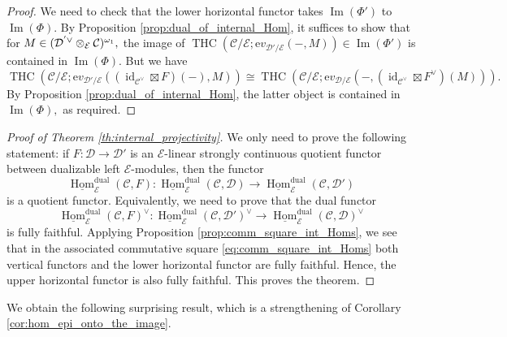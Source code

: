 \documentclass[11pt,leqno]{amsart}
\numberwithin{equation}{section}
\def\Hom{\operatorname{Hom}}
\newcommand{\tens}[1]{%
  \mathbin{\mathop{\otimes}\displaylimits_{#1}}%
}
\newcommand{\dual}{\operatorname{dual}}
\newcommand{\ev}{\mathrm ev}
\newcommand{\cD}{{\mathcal D}}
\newcommand{\cC}{{\mathcal C}}
\newcommand{\cE}{{\mathcal E}}
\newcommand{\un}{\underline}
\newcommand{\THC}{\operatorname{THC}}
\newcommand{\Fun}{\operatorname{Fun}}
\newcommand{\im}{\operatorname{Im}}
\newcommand{\Sp}{\operatorname{Sp}}
\newcommand{\id}{\operatorname{id}}
\begin{document}
\begin{proof}We need to check that the lower horizontal functor takes $\im(\Phi')$ to $\im(\Phi).$ By Proposition \ref{prop:dual_of_internal_Hom}, it suffices to show that for $M\in (\cD^{'\vee}\tens{\cE}\cC)^{\omega_1},$ the image of 
$\THC(\cC/\cE;\ev_{\cD'/\cE}(-,M))\in\im(\Phi')$ is contained in $\im(\Phi).$ But we have
\begin{equation*}
\THC(\cC/\cE;\ev_{\cD'/\cE}((\id_{\cC^{\vee}}\boxtimes F)(-),M))\cong \THC(\cC/\cE;\ev_{\cD/\cE}(-,(\id_{\cC^{\vee}}\boxtimes F^{\vee})(M))).
\end{equation*}
By Proposition \ref{prop:dual_of_internal_Hom}, the latter object is contained in $\im(\Phi),$ as required.
\end{proof}

\begin{proof}[Proof of Theorem \ref{th:internal_projectivity}] We only need to prove the following statement: if $F:\cD\to\cD'$ is an $\cE$-linear strongly continuous quotient functor between dualizable left $\cE$-modules, then the functor \begin{equation*}
		\un{\Hom}_{\cE}^{\dual}(\cC,F):\un{\Hom}_{\cE}^{\dual}(\cC,\cD)\to \un{\Hom}_{\cE}^{\dual}(\cC,\cD')
	\end{equation*}
is a quotient functor. Equivalently, we need to prove that the dual functor
\begin{equation*}
	\un{\Hom}_{\cE}^{\dual}(\cC,F)^{\vee}:\un{\Hom}_{\cE}^{\dual}(\cC,\cD')^{\vee}\to \un{\Hom}_{\cE}^{\dual}(\cC,\cD)^{\vee}
\end{equation*}
is fully faithful. Applying Proposition \ref{prop:comm_square_int_Homs}, we see that in the associated commutative square \eqref{eq:comm_square_int_Homs}
both vertical functors and the lower horizontal functor are fully faithful. Hence, the upper horizontal functor is also fully faithful. This proves the theorem.
\end{proof}

We obtain the following surprising result, which is a strengthening of Corollary \ref{cor:hom_epi_onto_the_image}.
\end{document}
